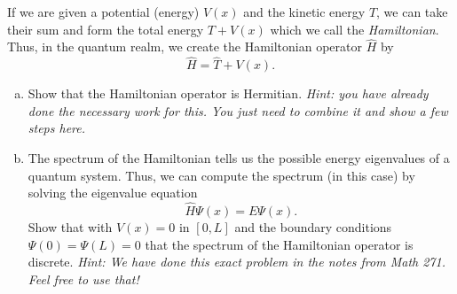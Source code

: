 \documentclass[12pt]{article} %
\begin{document}
\begin{problem}
If we are given a potential (energy) $V(x)$ and the kinetic energy $T$, we can take their sum and form the total energy $T+V(x)$ which we call the \emph{Hamiltonian}.  Thus, in the quantum realm, we create the Hamiltonian operator $\hat{H}$ by
\[
\hat{H}=\hat{T}+V(x).
\]
\begin{enumerate}[(a)]
	\item Show that the Hamiltonian operator is Hermitian. \emph{Hint: you have already done the necessary work for this. You just need to combine it and show a few steps here.}
	\item The spectrum of the Hamiltonian tells us the possible energy eigenvalues of a quantum system. Thus, we can compute the spectrum (in this case) by solving the eigenvalue equation
	\[
	\hat{H}\Psi(x)=E\Psi(x).
	\]
	Show that with $V(x)=0$ in $[0,L]$ and the boundary conditions $\Psi(0)=\Psi(L)=0$ that the spectrum of the Hamiltonian operator is discrete.  \emph{Hint: We have done this exact problem in the notes from Math 271. Feel free to use that!}
\end{enumerate}
\end{problem}
\end{document}
